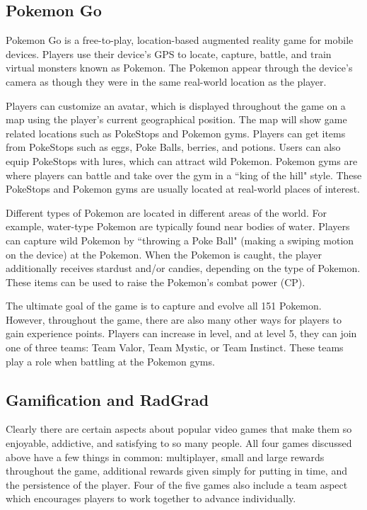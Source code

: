\subsection{Pokemon Go}
Pokemon Go is a free-to-play, location-based augmented reality game for mobile devices. Players use their device's GPS to locate, capture, battle, and train virtual monsters known as Pokemon. The Pokemon appear through the device's camera as though they were in the same real-world location as the player. 

Players can customize an avatar, which is displayed throughout the game on a map using the player's current geographical position. The map will show game related locations such as PokeStops and Pokemon gyms. Players can get items from PokeStops such as eggs, Poke Balls, berries, and potions. Users can also equip PokeStops with lures, which can attract wild Pokemon. Pokemon gyms are where players can battle and take over the gym in a ``king of the hill" style. These PokeStops and Pokemon gyms are usually located at real-world places of interest. 

Different types of Pokemon are located in different areas of the world. For example, water-type Pokemon are typically found near bodies of water. Players can capture wild Pokemon by ``throwing a Poke Ball" (making a swiping motion on the device) at the Pokemon. When the Pokemon is caught, the player additionally receives stardust and/or candies, depending on the type of Pokemon. These items can be used to raise the Pokemon's combat power (CP). 

The ultimate goal of the game is to capture and evolve all 151 Pokemon. However, throughout the game, there are also many other ways for players to gain experience points. Players can increase in level, and at level 5, they can join one of three teams: Team Valor, Team Mystic, or Team Instinct. These teams play a role when battling at the Pokemon gyms. 

\subsection{Gamification and RadGrad}
Clearly there are certain aspects about popular video games that make them so enjoyable, addictive, and satisfying to so many people. All four games discussed above have a few things in common: multiplayer, small and large rewards throughout the game, additional rewards given simply for putting in time, and the persistence of the player. Four of the five games also include a team aspect which encourages players to work together to advance individually. 

